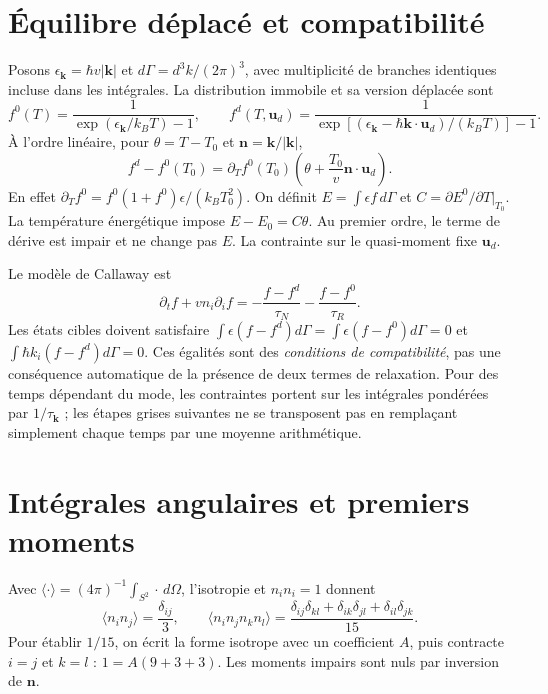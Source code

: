 \documentclass[11pt,a4paper]{article}
\begin{document}
\section{Équilibre déplacé et compatibilité}
Posons $\epsilon_{\mathbf k}=\hbar v|\mathbf k|$ et
$d\Gamma=d^3k/(2\pi)^3$, avec multiplicité de branches identiques incluse
dans les intégrales. La distribution immobile et sa version déplacée sont
\[
 f^0(T)=\frac1{\exp(\epsilon_{\mathbf k}/k_BT)-1},\qquad
 f^d(T,\mathbf u_d)=
 \frac1{\exp[(\epsilon_{\mathbf k}-\hbar\mathbf k\cdot\mathbf u_d)/(k_BT)]-1}.
\]
À l'ordre linéaire, pour $\theta=T-T_0$ et $\mathbf n=\mathbf k/|\mathbf k|$,
\[
 f^d-f^0(T_0)=
 \partial_T f^0(T_0)\left(\theta+\frac{T_0}{v}\mathbf n\cdot\mathbf u_d\right).
\]
En effet $\partial_T f^0=f^0(1+f^0)\epsilon/(k_BT_0^2)$.
On définit $E=\int\epsilon f\,d\Gamma$ et
$C=\partial E^0/\partial T|_{T_0}$. La température énergétique impose
$E-E_0=C\theta$. Au premier ordre, le terme de dérive est impair et ne change
pas $E$. La contrainte sur le quasi-moment fixe $\mathbf u_d$.

Le modèle de Callaway est
\[
 \partial_t f+v n_i\partial_i f
 =-\frac{f-f^d}{\tau_N}-\frac{f-f^0}{\tau_R}.
\]
Les états cibles doivent satisfaire
$\int\epsilon(f-f^d)d\Gamma=\int\epsilon(f-f^0)d\Gamma=0$ et
$\int\hbar k_i(f-f^d)d\Gamma=0$.
Ces égalités sont des \emph{conditions de compatibilité}, pas une conséquence
automatique de la présence de deux termes de relaxation.
Pour des temps dépendant du mode, les contraintes portent sur les intégrales
pondérées par $1/\tau_{\mathbf k}$ ; les étapes grises suivantes ne se transposent
pas en remplaçant simplement chaque temps par une moyenne arithmétique.

\section{Intégrales angulaires et premiers moments}
Avec $\langle\cdot\rangle=(4\pi)^{-1}\int_{S^2}\cdot\,d\Omega$,
l'isotropie et $n_i n_i=1$ donnent
\[
 \langle n_i n_j\rangle=\frac{\delta_{ij}}3,\qquad
 \langle n_i n_j n_k n_l\rangle=
 \frac{\delta_{ij}\delta_{kl}+\delta_{ik}\delta_{jl}
       +\delta_{il}\delta_{jk}}{15}.
\]
Pour établir $1/15$, on écrit la forme isotrope avec un coefficient $A$,
puis contracte $i=j$ et $k=l$ : $1=A(9+3+3)$.
Les moments impairs sont nuls par inversion de $\mathbf n$.
\end{document}
